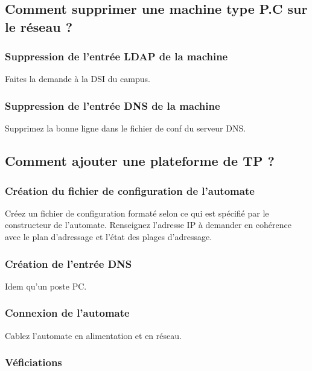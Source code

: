\documentclass[a4paper]{article}
\begin{document}
\subsection{Comment supprimer une machine type P.C sur le réseau ?}

\subsubsection{Suppression de l'entrée LDAP de la machine}

Faites la demande à la DSI du campus.

\subsubsection{Suppression de l'entrée DNS de la machine}

Supprimez la bonne ligne dans le fichier de conf du serveur DNS.

\subsection{Comment ajouter une plateforme de TP  ?}

\subsubsection{Création du fichier de configuration de l'automate}

Créez un fichier de configuration formaté selon ce qui est spécifié par le constructeur de l'automate.
Renseignez l'adresse IP à demander en cohérence avec le plan d'adressage et l'état des plages d'adressage.

\subsubsection{Création de l'entrée DNS}

Idem qu'un poste PC.

\subsubsection{Connexion de l'automate}

Cablez l'automate en alimentation et en réseau.

\subsubsection{Véficiations}
\end{document}
